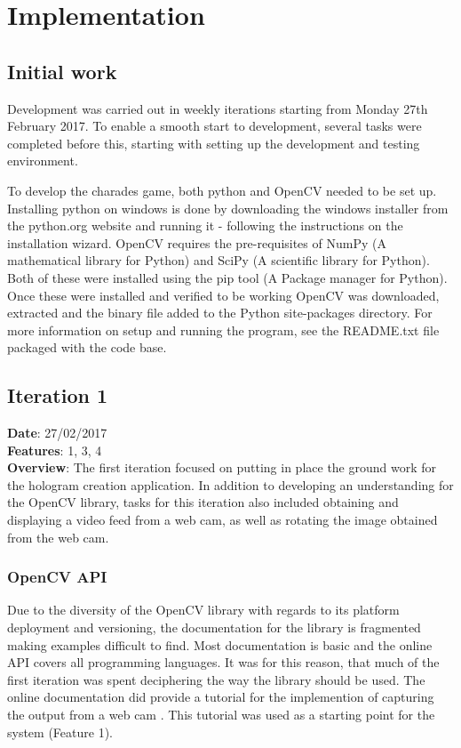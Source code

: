 \chapter{Implementation}

\section{Initial work}
Development was carried out in weekly iterations starting from Monday 27th February 2017. To enable a smooth start to development, several tasks were completed before this, starting with setting up the development and testing environment.

To develop the charades game, both python and OpenCV needed to be set up. Installing python on windows is done by downloading the windows installer from the python.org website and running it - following the instructions on the installation wizard. OpenCV requires the pre-requisites of NumPy (A mathematical library for Python) and SciPy (A scientific library for Python). Both of these were installed using the pip tool (A Package manager for Python). Once these were installed and verified to be working OpenCV was downloaded, extracted and the binary file added to the Python site-packages directory. For more information on setup and running the program, see the README.txt file packaged with the code base.

\section{Iteration 1}
\textbf{Date}: 27/02/2017 \\
\textbf{Features}: 1, 3, 4 \\
\textbf{Overview}: The first iteration focused on putting in place the ground work for the hologram creation application. In addition to developing an understanding for the OpenCV library, tasks for this iteration also included obtaining and displaying a video feed from a web cam, as well as rotating the image obtained from the web cam.

\subsection{OpenCV API}
Due to the diversity of the OpenCV library with regards to its platform deployment and versioning, the documentation for the library is fragmented making examples difficult to find. Most documentation is basic and the online API covers all programming languages. It was for this reason, that much of the first iteration was spent deciphering the way the library should be used. The online documentation did provide a tutorial for the implemention of capturing the output from a web cam \cite{video_capture_tutorial}. This tutorial was used as a starting point for the system (Feature 1).

